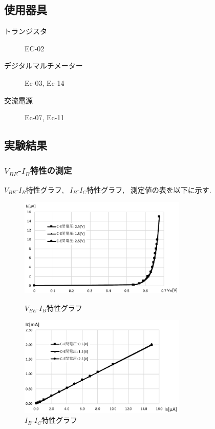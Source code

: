 \documentclass[uplatex,dvipdfmx,a4paper,js=standard, titlepage]{bxjsarticle}
\begin{document}
    \subsection{使用器具}
        \begin{description}
            \item[トランジスタ] EC-02
            \item[デジタルマルチメーター] Ec-03, Ec-14
            \item[交流電源] Ec-07, Ec-11
        \end{description}

    \subsection{実験結果}
        \subsubsection{$V_{BE}$-$I_B$特性の測定}
            $V_{BE}$-$I_B$特性グラフ, ~$I_B$-$I_C$特性グラフ, ~測定値の表を以下に示す.

            \begin{figure}[ht]
                \begin{minipage}{0.5\hsize}
                    \begin{center}
                        \includegraphics[width=8cm]{graphs/VBE-IB_graph.pdf}
                        \caption{$V_{BE}$-$I_B$特性グラフ}
                        \label{fig:VBE-IB_graph}
                    \end{center}
                \end{minipage}
                \begin{minipage}{0.5\hsize}
                    \begin{center}
                        \includegraphics[width=8cm]{graphs/IB-IC_graph.pdf}
                        \caption{$I_B$-$I_C$特性グラフ}
                        \label{fig:IB-IC_graph}
                    \end{center}
                \end{minipage}
            \end{figure}
\end{document}
